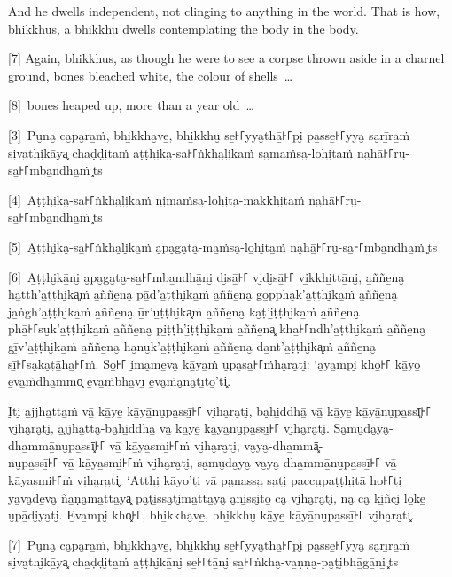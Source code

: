 And he dwells independent, not clinging to anything in the world. That is how,
bhikkhus, a bhikkhu dwells contemplating the body in the body.

[7] Again, bhikkhus, as though he were to see a corpse thrown aside in a charnel
ground, bones bleached white, the colour of shells~\ldots{}

[8]~bones heaped up, more than a year old~\ldots{}

\paliPage

[3]~Pu̮na̮ ca̮pa̮ra̱ṁ, bhi̱kkha̮ve̱, bhi̱kkhu̮ se̱꜔꜒yya̮thā̱꜔꜒pi̮ pa̱sse̱꜔꜒yya̮ sa̮rī̱ra̱ṁ si̮va̮thi̮kā̱ya͓
cha̱ḍḍi̮ta̱ṁ a̱ṭṭhi̮ka̮-sa̱꜔꜒ṅkha̮li̮ka̱ṁ sa̮ma̱ṁsa̮-lo̱hi̮ta̱ṁ na̮hā̱꜔꜒ru̮-sa̱꜔꜒mba̱ndha̱ṁ~\ldo͓ts{}

[4]~A̱ṭṭhi̮ka̮-sa̱꜔꜒ṅkha̮li̮ka̱ṁ ni̮ma̱ṁsa̮-lo̱hi̮ta̮-ma̱kkhi̮ta̱ṁ na̮hā̱꜔꜒ru̮-sa̱꜔꜒mba̱ndha̱ṁ~\ldo͓ts{}

[5]~A̱ṭṭhi̮ka̮-sa̱꜔꜒ṅkha̮li̮ka̱ṁ a̮pa̮ga̮ta̮-ma̱ṁsa̮-lo̱hi̮ta̱ṁ na̮hā̱꜔꜒ru̮-sa̱꜔꜒mba̱ndha̱ṁ~\ldo͓ts{}

[6]~A̱ṭṭhi̮kā̱ni̮ a̮pa̮ga̮ta̮-sa̱꜔꜒mba̱ndhā̱ni̮ di̮sā̱꜔꜒ vi̮di̮sā̱꜔꜒ vi̱kkhi̱ttā̱ni̮, a̱ññe̱na̮ ha̱tth'a̱ṭṭhi̮ka͓ṁ
a̱ññe̱na̮ pā̱d'a̱ṭṭhi̮ka̱ṁ a̱ññe̱na̮ go̱ppha̮k'a̱ṭṭhi̮ka̱ṁ a̱ññe̱na̮ ja̱ṅgh'a̱ṭṭhi̮ka̱ṁ a̱ññe̱na̮ ū̱r'u̱ṭṭhi̮ka͓ṁ
a̱ññe̱na̮ ka̮ṭ'i̱ṭṭhi̮ka̱ṁ a̱ññe̱na̮ phā̱꜔꜒su̮k'a̱ṭṭhi̮ka̱ṁ a̱ññe̱na̮ pi̱ṭṭh'i̱ṭṭhi̮ka̱ṁ a̱ññe̱na͓
kha̱꜔꜒ndh'a̱ṭṭhi̮ka̱ṁ a̱ññe̱na̮ gī̱v'a̱ṭṭhi̮ka̱ṁ a̱ññe̱na̮ ha̮nu̮k'a̱ṭṭhi̮ka̱ṁ a̱ññe̱na̮ da̱nt'a̱ṭṭhi̮ka͓ṁ
a̱ññe̱na̮ sī̱꜔꜒sa̮ka̮ṭā̱ha̱꜔꜒ṁ. So̱꜔꜒ i̮ma̮me̱va̮ kā̱ya̱ṁ u̮pa̮sa̱꜔꜒ṁha̮ra̮ti̮: ‘a̮ya̱mpi̮ kho̱꜔꜒ kā̱yo̱ e̱va̱ṁdha̱mmo͓
e̱va̱ṁbhā̱vī̱ e̱va̮ṁa̮na̮tī̱to̱’ti͓.

I̮ti̮ a̱jjha̱tta̱ṁ vā̱ kā̱ye̱ kā̱yā̱nu̮pa̱ssī̱꜔꜒ vi̮ha̮ra̮ti̮, ba̮hi̱ddhā̱ vā̱ kā̱ye̱ kā̱yā̱nu̮pa̱ssī͓꜔꜒
vi̮ha̮ra̮ti̮, a̱jjha̱tta̮-ba̮hi̱ddhā̱ vā̱ kā̱ye̱ kā̱yā̱nu̮pa̱ssī̱꜔꜒ vi̮ha̮ra̮ti̮. Sa̮mu̮da̮ya̮-dha̱mmā̱nu̮pa̱ssī͓꜔꜒
vā̱ kā̱ya̱smi̱꜔꜒ṁ vi̮ha̮ra̮ti̮, va̮ya̮-dha̱mmā͓-\\
nu̮pa̱ssī̱꜔꜒ vā̱ kā̱ya̱smi̱꜔꜒ṁ vi̮ha̮ra̮ti̮, sa̮mu̮da̮ya̮-va̮ya̮-dha̱mmā̱nu̮pa̱ssī̱꜔꜒ vā̱ kā̱ya̱smi̱꜔꜒ṁ vi̮ha̮ra̮ti͓.
‘A̱tthi̮ kā̱yo̱’ti̮ vā̱ pa̮na̱ssa̮ sa̮ti̮ pa̱ccu̮pa̱ṭṭhi̮tā̱ ho̱꜔꜒ti̮ yā̱va̮de̱va̮ ñā̱ṇa̮ma̱ttā̱ya͓
pa̮ṭi̱ssa̮ti̮ma̱ttā̱ya̮ a̮ni̱ssi̮to̱ ca̮ vi̮ha̮ra̮ti̮, na̮ ca̮ ki̱ñci̮ lo̱ke̱ u̮pā̱di̮ya̮ti̮. E̱va̱mpi̮ kho͓꜔꜒,
bhi̱kkha̮ve̱, bhi̱kkhu̮ kā̱ye̱ kā̱yā̱nu̮pa̱ssī̱꜔꜒ vi̮ha̮ra̮ti͓.

[7]~Pu̮na̮ ca̮pa̮ra̱ṁ, bhi̱kkha̮ve̱, bhi̱kkhu̮ se̱꜔꜒yya̮thā̱꜔꜒pi̮ pa̱sse̱꜔꜒yya̮ sa̮rī̱ra̱ṁ si̮va̮thi̮kā̱ya͓
cha̱ḍḍi̮ta̱ṁ a̱ṭṭhi̮kā̱ni̮ se̱꜔꜒tā̱ni̮ sa̱꜔꜒ṅkha̮-va̱ṇṇa̮-pa̮ṭi̮bhā̱gā̱ni̱~\ldo͓ts{}

